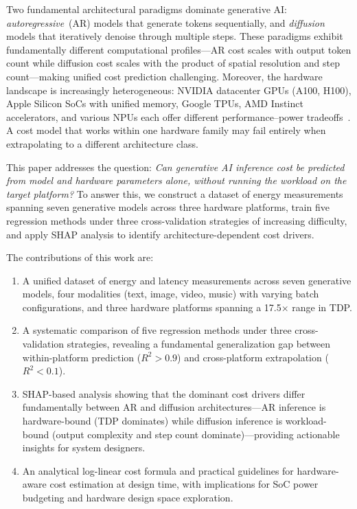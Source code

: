 \documentclass{ieeeaccess}
\begin{document}
Two fundamental architectural paradigms dominate generative AI: \emph{autoregressive}~(AR) models that generate tokens sequentially, and \emph{diffusion} models that iteratively denoise through multiple steps.
These paradigms exhibit fundamentally different computational profiles---AR cost scales with output token count while diffusion cost scales with the product of spatial resolution and step count---making unified cost prediction challenging.
Moreover, the hardware landscape is increasingly heterogeneous: NVIDIA datacenter GPUs (A100, H100), Apple Silicon SoCs with unified memory, Google TPUs, AMD Instinct accelerators, and various NPUs each offer different performance--power tradeoffs~\cite{jouppi2017datacenter}.
A cost model that works within one hardware family may fail entirely when extrapolating to a different architecture class.

This paper addresses the question: \emph{Can generative AI inference cost be predicted from model and hardware parameters alone, without running the workload on the target platform?}
To answer this, we construct a dataset of \unskip{} energy measurements spanning seven generative models across three hardware platforms, train five regression methods under three cross-validation strategies of increasing difficulty, and apply SHAP analysis to identify architecture-dependent cost drivers.

The contributions of this work are:
\begin{enumerate}
\item A unified dataset of \unskip{} energy and latency measurements across seven generative models, four modalities (text, image, video, music) with varying batch configurations, and three hardware platforms spanning a 17.5$\times$ range in TDP.
\item A systematic comparison of five regression methods under three cross-validation strategies, revealing a fundamental generalization gap between within-platform prediction ($R^2 {>} 0.9$) and cross-platform extrapolation ($R^2 {<} 0.1$).
\item SHAP-based analysis showing that the dominant cost drivers differ fundamentally between AR and diffusion architectures---AR inference is hardware-bound (TDP dominates) while diffusion inference is workload-bound (output complexity and step count dominate)---providing actionable insights for system designers.
\item An analytical log-linear cost formula and practical guidelines for hardware-aware cost estimation at design time, with implications for SoC power budgeting and hardware design space exploration.
\end{enumerate}
\end{document}
